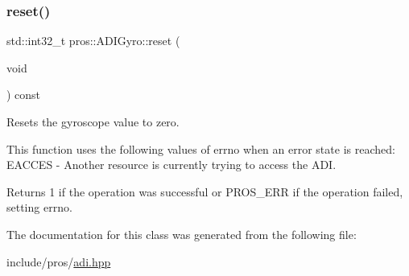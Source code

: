 \subsubsection{\texorpdfstring{reset()}{reset()}}
{\footnotesize\ttfamily std\+::int32\+\_\+t pros\+::\+A\+D\+I\+Gyro\+::reset (\begin{DoxyParamCaption}\item[{void}]{ }\end{DoxyParamCaption}) const}



Resets the gyroscope value to zero. 

This function uses the following values of errno when an error state is reached\+: E\+A\+C\+C\+ES -\/ Another resource is currently trying to access the A\+DI.

\begin{DoxyReturn}{Returns}
1 if the operation was successful or P\+R\+O\+S\+\_\+\+E\+RR if the operation failed, setting errno. 
\end{DoxyReturn}


The documentation for this class was generated from the following file\+:\begin{DoxyCompactItemize}
\item 
include/pros/\mbox{\hyperlink{adi_8hpp}{adi.\+hpp}}\end{DoxyCompactItemize}
